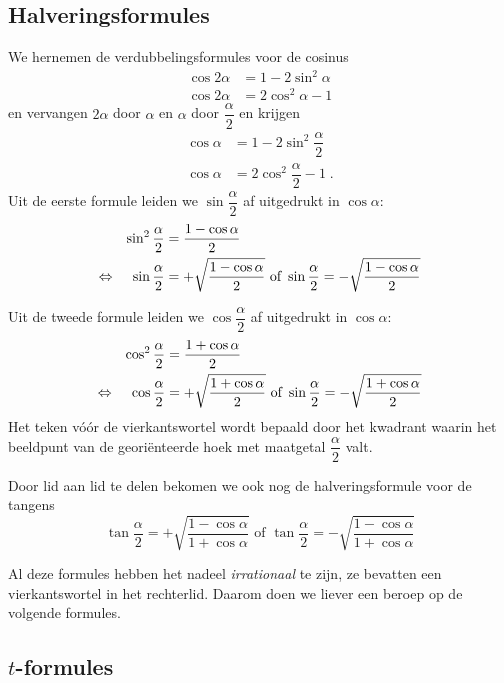 \documentclass[a4paper,12pt]{article}
\begin{document}
\vspace*{-0.5cm}
\subsection{Halveringsformules}

We hernemen de verdubbelingsformules voor de cosinus
\begin{align*}
  \cos 2\alpha &= 1 - 2\sin^2\alpha\\
  \cos 2\alpha &= 2\cos^2\alpha - 1
\end{align*}
en vervangen $2\alpha$ door $\alpha$ en $\alpha$ door $\dfrac{\alpha}{2}$ en krijgen
\begin{align*}
  \cos \alpha &= 1 - 2\sin^2\dfrac{\alpha}{2}\\
  \cos \alpha &= 2\cos^2\dfrac{\alpha}{2} - 1\;.
\end{align*}
Uit de eerste formule leiden we $\sin\dfrac{\alpha}{2}$ af uitgedrukt in $\cos\alpha$:
\begin{align*}
          && \sin^2\dfrac{\alpha}{2} &= \dfrac{1-\cos\alpha}{2}\\
     \Leftrightarrow &&   \sin\dfrac{\alpha}{2} &= +\sqrt{\dfrac{1-\cos\alpha}{2}} \mbox{ of } \sin\dfrac{\alpha}{2}= -\sqrt{\dfrac{1-\cos\alpha}{2}}
\end{align*}

Uit de tweede formule leiden we $\cos\dfrac{\alpha}{2}$ af uitgedrukt in $\cos\alpha$:
\begin{align*}
          && \cos^2\dfrac{\alpha}{2} &= \dfrac{1+\cos\alpha}{2}\\
     \Leftrightarrow &&   \cos\dfrac{\alpha}{2} &= +\sqrt{\dfrac{1+\cos\alpha}{2}} \mbox{ of } \sin\dfrac{\alpha}{2}= -\sqrt{\dfrac{1+\cos\alpha}{2}}
\end{align*}
Het teken vóór de vierkantswortel wordt bepaald door het kwadrant waarin het
beeldpunt van de georiënteerde hoek met maatgetal $\dfrac{\alpha}{2}$ valt.

Door lid aan lid te delen bekomen we ook nog de halveringsformule voor de tangens
$$\tan\dfrac{\alpha}{2} = +\sqrt{\dfrac{1-\cos\alpha}{1+\cos\alpha}} \mbox{ of } \tan\dfrac{\alpha}{2} = -\sqrt{\dfrac{1-\cos\alpha}{1+\cos\alpha}}$$

Al deze formules hebben het nadeel {\em irrationaal} te zijn, ze bevatten een vierkantswortel in het rechterlid.
Daarom doen we liever een beroep op de volgende formules.

\subsection{$t$-formules}
\end{document}
